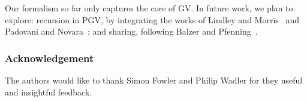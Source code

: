 \documentclass[main.tex]{subfiles}
\begin{document}
Our formalism so far only captures the core of GV. In future work, we plan to explore: recursion in PGV, by integrating the works of Lindley and Morris~\cite{lindleymorris16} and Padovani and Novara~\cite{padovaninovara15}; %
and sharing, following Balzer and Pfenning~\cite{balzerpfenning17}.

\subsubsection*{Acknowledgement} The authors would like to thank Simon Fowler and Philip Wadler for they useful and insightful feedback.
\end{document}
